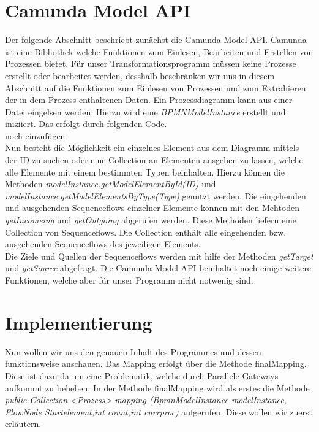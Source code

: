 \section{Camunda Model API}\label{Camunda Model API}
Der folgende Abschnitt beschriebt zunächst die Camunda Model API. Camunda ist eine Bibliothek welche Funktionen zum Einlesen, Bearbeiten und Erstellen von Prozessen bietet. Für unser Transformationsprogramm müssen keine Prozesse erstellt oder bearbeitet werden, desshalb beschränken wir uns in diesem Abschnitt auf die Funktionen zum Einlesen von Prozessen und zum Extrahieren der in dem Prozess enthaltenen Daten. Ein Prozessdiagramm kann aus einer Datei eingelsen werden. Hierzu wird eine \textit{BPMNModelInstance} erstellt und iniziiert. Das erfolgt durch folgenden Code.\\
noch einzufügen\\
Nun besteht die Möglichkeit ein einzelnes Element aus dem Diagramm mittels der ID zu suchen oder eine Collection an Elementen ausgeben zu lassen, welche alle Elemente mit einem bestimmten Typen beinhalten. Hierzu können die Methoden \textit{modelInstance.getModelElementById(ID)} und \textit{modelInstance.getModelElementsByType(Type)} genutzt werden. Die eingehenden und ausgehenden Sequenceflows einzelner Elemente können mit den Mehtoden \textit{getIncomeing} und \textit{getOutgoing} abgerufen werden. Diese Methoden liefern eine Collection von Sequenceflows. Die Collection enthält alle eingehenden bzw. ausgehenden Sequenceflows des jeweiligen Elements.\\
Die Ziele und Quellen der Sequenceflows werden mit hilfe der Methoden \textit{getTarget} und \textit{getSource} abgefragt.
Die Camunda Model API beinhaltet noch einige weitere Funktionen, welche aber für unser Programm nicht notwenig sind.\\
\section{Implementierung}\label{Implementierung}
Nun wollen wir uns den genauen Inhalt des Programmes und dessen funktionsweise anschauen. Das Mapping erfolgt über die Methode finalMapping. Diese ist dazu da um eine Problematik, welche durch Parallele Gateways aufkommt zu beheben. In der Methode finalMapping wird als erstes die Methode \textit{public Collection <Prozess> mapping (BpmnModelInstance modelInstance, FlowNode Startelement,int count,int currproc)} aufgerufen. Diese wollen wir zuerst erläutern.
